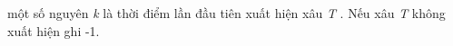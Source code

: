 một số nguyên \emph{ k } là thời điểm lần đầu tiên xuất hiện xâu \emph{ T } . Nếu xâu \emph{ T } không xuất hiện ghi -1.